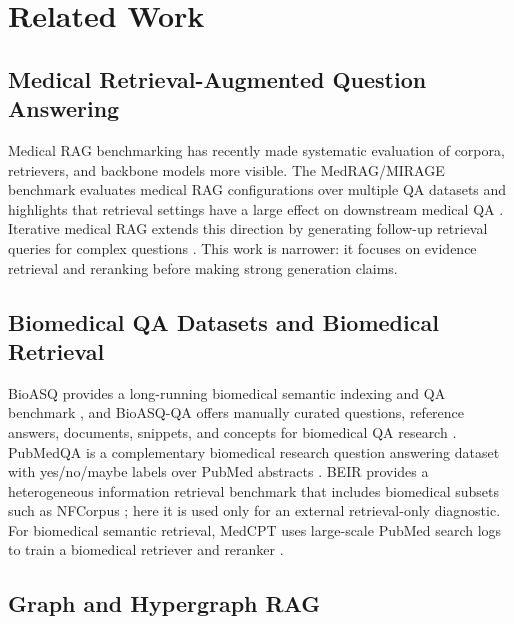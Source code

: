 \section{Related Work}

\subsection{Medical Retrieval-Augmented Question Answering}

Medical RAG benchmarking has recently made systematic evaluation of corpora, retrievers, and backbone models more visible. The MedRAG/MIRAGE benchmark evaluates medical RAG configurations over multiple QA datasets and highlights that retrieval settings have a large effect on downstream medical QA \citep{xiong2024benchmarking}. Iterative medical RAG extends this direction by generating follow-up retrieval queries for complex questions \citep{xiong2024imedrag}. This work is narrower: it focuses on evidence retrieval and reranking before making strong generation claims.

\subsection{Biomedical QA Datasets and Biomedical Retrieval}

BioASQ provides a long-running biomedical semantic indexing and QA benchmark \citep{tsatsaronis2015bioasq}, and BioASQ-QA offers manually curated questions, reference answers, documents, snippets, and concepts for biomedical QA research \citep{krithara2023bioasqqa}. PubMedQA is a complementary biomedical research question answering dataset with yes/no/maybe labels over PubMed abstracts \citep{jin2019pubmedqa}. BEIR provides a heterogeneous information retrieval benchmark that includes biomedical subsets such as NFCorpus \citep{thakur2021beir}; here it is used only for an external retrieval-only diagnostic. For biomedical semantic retrieval, MedCPT uses large-scale PubMed search logs to train a biomedical retriever and reranker \citep{jin2023medcpt}.

\subsection{Graph and Hypergraph RAG}

